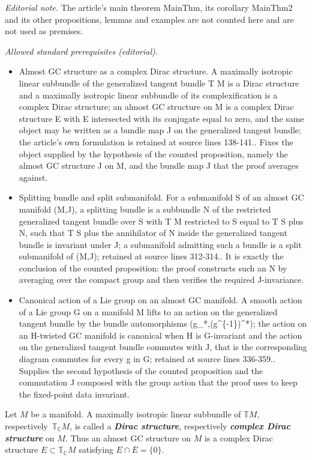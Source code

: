 \documentclass{article}
\numberwithin{equation}{section}
\newcommand{\deff}[1]{\textbf{\emph{#1}}}
\newcommand{\pont}[1]{\mathbb{T} {#1}}
\newcommand{\cpont}[1]{\mathbb{T}_{\mathbb{C}} {#1}}
\begin{document}
\noindent\textit{Editorial note.} The article's main theorem MainThm, its corollary MainThm2 and its other propositions, lemmas and examples are not counted here and are not used as premises.\par\medskip
\noindent\textit{Allowed standard prerequisites (editorial).}\begin{itemize}
\item Almost GC structure as a complex Dirac structure. A maximally isotropic linear subbundle of the generalized tangent bundle T M is a Dirac structure and a maximally isotropic linear subbundle of its complexification is a complex Dirac structure; an almost GC structure on M is a complex Dirac structure E with E intersected with its conjugate equal to zero, and the same object may be written as a bundle map J on the generalized tangent bundle; the article's own formulation is retained at source lines 138-141.. Fixes the object supplied by the hypothesis of the counted proposition, namely the almost GC structure J on M, and the bundle map J that the proof averages against.
\item Splitting bundle and split submanifold. For a submanifold S of an almost GC manifold (M,J), a splitting bundle is a subbundle N of the restricted generalized tangent bundle over S with T M restricted to S equal to T S plus N, such that T S plus the annihilator of N inside the generalized tangent bundle is invariant under J; a submanifold admitting such a bundle is a split submanifold of (M,J); retained at source lines 312-314.. It is exactly the conclusion of the counted proposition: the proof constructs such an N by averaging over the compact group and then verifies the required J-invariance.
\item Canonical action of a Lie group on an almost GC manifold. A smooth action of a Lie group G on a manifold M lifts to an action on the generalized tangent bundle by the bundle automorphisms (g\_*,(g\textasciicircum{}\{-1\})\textasciicircum{}*); the action on an H-twisted GC manifold is canonical when H is G-invariant and the action on the generalized tangent bundle commutes with J, that is the corresponding diagram commutes for every g in G; retained at source lines 336-359.. Supplies the second hypothesis of the counted proposition and the commutation J composed with the group action that the proof uses to keep the fixed-point data invariant.
\end{itemize}\medskip
\begin{Remark}
Let $M$ be a manifold.  A maximally isotropic linear subbundle of $\pont{M}$, respectively~$\cpont{M}$, is called a \deff{Dirac structure}, respectively \deff{complex Dirac structure} on $M$.
Thus an almost GC structure on $M$ is a complex Dirac structure $E \subset \cpont{M}$ satisfying $E \cap \overline{E} = \{0\}$.
\end{Remark}
\end{document}
